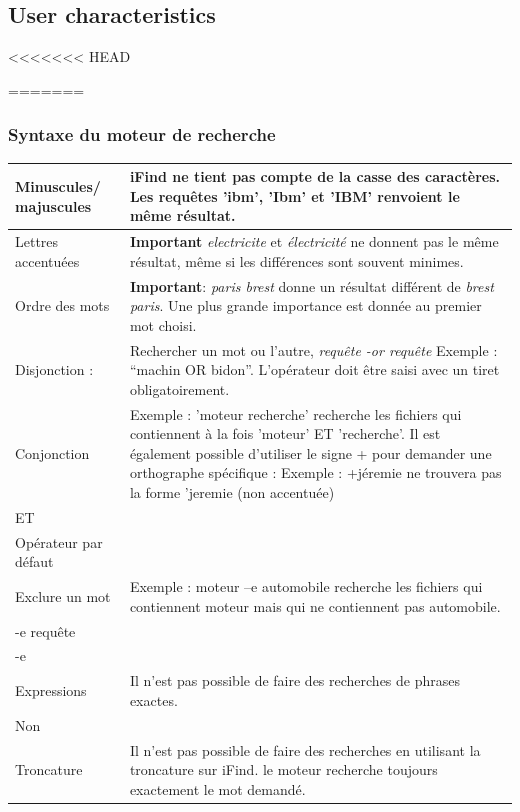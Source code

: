 \documentclass[a4paper,10pt]{report}
\begin{document}
\subsection{User characteristics}

<<<<<<< HEAD


=======
\subsubsection{Syntaxe du moteur de recherche}

\begin{tabular}{|p{4cm}|p{10cm}|}
\hline
Minuscules/ majuscules & iFind ne tient pas compte de la casse des caractères.
Les requêtes 'ibm', 'Ibm' et 'IBM' renvoient le même résultat.\\
\hline
Lettres accentuées & \textbf{Important} \textit{electricite} et
\textit{électricité} ne donnent pas le même résultat, même si les différences
sont souvent minimes.\\
\hline
Ordre des mots & \textbf{Important}: \textit{paris brest } donne un résultat 
différent de \textit{brest paris}. Une plus grande importance est donnée au
premier 
mot choisi.\\
\hline
Disjonction : & Rechercher un mot ou  l'autre, \textit{requête -or requête}
Exemple : “machin OR bidon”. L'opérateur doit être saisi avec un tiret
obligatoirement.\\
\hline
Conjonction & Exemple : 'moteur recherche' recherche les
fichiers qui contiennent à la fois 'moteur' ET 'recherche'. Il est également
possible d'utiliser le signe + pour demander une orthographe spécifique :
Exemple : +jéremie ne trouvera pas la forme 'jeremie (non accentuée)\\
ET & \\
Opérateur par défaut & \\
\hline
Exclure un mot & Exemple : moteur –e automobile recherche les fichiers qui
contiennent moteur
mais qui ne contiennent pas automobile.\\
-e requête & \\
-e & \\
\hline
Expressions & Il n'est pas possible de faire des recherches de phrases
exactes.\\
Non & \\
\hline
Troncature & Il n'est pas possible de faire des recherches en utilisant la
troncature sur iFind. le moteur recherche toujours exactement le mot demandé.

\end{tabular}
\end{document}
